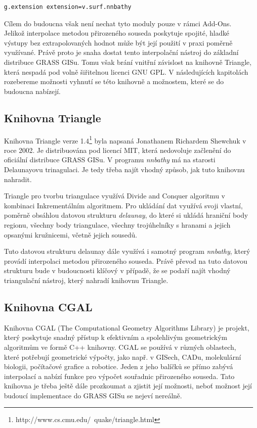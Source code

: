 \documentclass[12pt,a4paper]{article}
\begin{document}
\bigskip
\begin{lstlisting}[caption={Stáhnutí modulu v.surf.nnbathy pomocí g.extention}]
g.extension extension=v.surf.nnbathy
\end{lstlisting}

\bigskip
Cílem do budoucna však není nechat tyto moduly pouze v rámci Add-Ons. Jelikož interpolace metodou přirozeného souseda poskytuje spojité, hladké výstupy bez extrapolovaných hodnot může být její použití v praxi poměrně využívané. Právě proto je snaha dostat tento interpolační nástroj do základní distribuce GRASS GISu. Tomu však brání vnitřní závislost na knihovně Triangle, která nespadá pod volně šiřitelnou licenci GNU GPL. V následujících kapitolách rozebereme možnosti vyhnutí se této knihovně a možnostem, které se do budoucna nabízejí.

\newpage
\subsection{Knihovna Triangle}
Knihovna Triangle verze 1.4\footnote{http://www.cs.cmu.edu/~quake/triangle.html} byla napsaná Jonathanem Richardem Shewchuk v roce 2002. Je distribuována pod licencí MIT, která nedovoluje začlenění do oficiální distribuce GRASS GISu. V programu \emph{nnbathy} má na starosti Delaunayovu trinagulaci. Je tedy třeba najít vhodný způsob, jak tuto knihovnu nahradit.

Triangle pro tvorbu triangulace využívá Divide and Conquer algoritmu v kombinaci Inkrementálním algoritmem. Pro ukládání dat využívá svoji vlastní, poměrně obsáhlou datovou strukturu \emph{delaunay}, do které si ukládá hraniční body regionu, všechny body triangulace, všechny trojúhelníky s hranami a jejich opsanými kružnicemi, včetně jejich sousedů. 

Tuto datovou strukturu delaunay dále využívá i samotný program \emph{nnbathy}, který provádí interpolaci metodou přirozeného souseda. Právě převod na tuto datovou strukturu bude v budoucnosti klíčový v případě, že se podaří najít vhodný triangulační nástroj, který nahradí knihovnu Triangle.

\subsection{Knihovna CGAL}
Knihovna CGAL (The Computational Geometry Algorithms Library) je projekt, který poskytuje snadný přístup k efektivním a spolehlivým geometrickým algoritmům ve formě C++ knihovny. CGAL se používá v různých oblastech, které potřebují geometrické výpočty, jako např. v GISech, CADu, molekulární biologii, počítačové grafice a robotice. Jeden z jeho balíčků se přímo zabývá interpolací a nabízí funkce pro výpočet souřadnic přirozeného souseda. Tato knihovna je třeba ještě dále prozkoumat a zjistit její možnosti, neboť možnost její budoucí implementace do GRASS GISu se nejeví nereálně.
\end{document}

